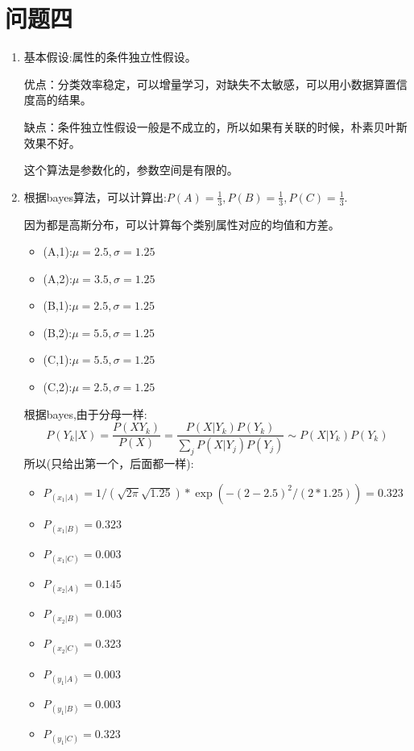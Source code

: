 \documentclass[answers]{exam}  %
\begin{document}
\section{问题四}
\begin{enumerate}[label=\alph*.] 
    \item 基本假设:属性的条件独立性假设。
    \par 优点：分类效率稳定，可以增量学习，对缺失不太敏感，可以用小数据算置信度高的结果。
    \par 缺点：条件独立性假设一般是不成立的，所以如果有关联的时候，朴素贝叶斯效果不好。
    \par 这个算法是参数化的，参数空间是有限的。
    \item 根据bayes算法，可以计算出:$P(A) = \frac{1}{3}, P(B) = \frac{1}{3}, P(C) = \frac{1}{3}.$
    \par 因为都是高斯分布，可以计算每个类别属性对应的均值和方差。
    \begin{itemize}
        \item (A,1):$\mu = 2.5, \sigma = 1.25$
        \item (A,2):$\mu = 3.5, \sigma = 1.25$
        \item (B,1):$\mu = 2.5, \sigma = 1.25$
        \item (B,2):$\mu = 5.5, \sigma = 1.25$
        \item (C,1):$\mu = 5.5, \sigma = 1.25$
        \item (C,2):$\mu = 2.5, \sigma = 1.25$
    \end{itemize}
    根据bayes,由于分母一样:
    \begin{equation*}
        P(Y_k|X) = \frac{P(XY_k)}{P(X)} = \frac{P(X|Y_k)P(Y_k)}{\sum_{j} P(X|Y_j)P(Y_j)} \sim P(X|Y_k)P(Y_k)
    \end{equation*}
    所以(只给出第一个，后面都一样):
    \begin{itemize}
        \item $P_{(x_1|A)} = 1/(\sqrt{2\pi}\sqrt{1.25})* \exp(-(2-2.5)^2/(2*1.25)) = 0.323$
        \item $P_{(x_1|B)} = 0.323$
        \item $P_{(x_1|C)} = 0.003$
        \item $P_{(x_2|A)} = 0.145$
        \item $P_{(x_2|B)} = 0.003$
        \item $P_{(x_2|C)} = 0.323$
        \item $P_{(y_1|A)} = 0.003$
        \item $P_{(y_1|B)} = 0.003$
        \item $P_{(y_1|C)} = 0.323$

\end{itemize}
\end{enumerate}
\end{document}
